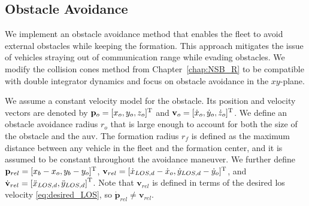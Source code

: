 \subsection{Obstacle Avoidance}\label{sec:obstacle_avoidance}
We implement an obstacle avoidance method that enables the fleet to avoid external obstacles while keeping the formation. This approach mitigates the issue of vehicles straying out of communication range while evading obstacles. We modify the collision cones method from Chapter~\ref{chap:NSB_R} to be compatible with double integrator dynamics and focus on obstacle avoidance in the $xy$-plane.

We assume a constant velocity model for the obstacle. Its position and velocity vectors are denoted by $\mathbf{p}_o = [x_o, y_o, z_o]^{\mathrm{T}}$ and $\mathbf{v}_o = [\dot{x}_o, \dot{y}_o, \dot{z}_o]^{\mathrm{T}}$. We define an obstacle avoidance radius $r_o$ that is large enough to account for both the size of the obstacle and the \gls{auv}. The formation radius $r_f$ is defined as the maximum distance between any vehicle in the fleet and the formation center, and it is assumed to be constant throughout the avoidance maneuver. We further define $\mathbf{p}_{rel} = [x_b-x_o, y_b-y_o]^{\mathrm{T}}$, $\mathbf{v}_{rel} = [\dot{x}_{LOS,d}-\dot{x}_o, \dot{y}_{LOS,d} - \dot{y}_o ]^{\mathrm{T}}$, and $\dot{\mathbf{v}}_{rel} = \left[ \ddot{x}_{LOS,d},  \ddot{y}_{LOS,d}\right]^{\mathrm{T}}$. Note that $\mathbf{v}_{rel}$ is defined in terms of the desired \gls{los} velocity \eqref{eq:desired_LOS}, so $\dot{\mathbf{p}}_{rel} \neq \mathbf{v}_{rel}$.

